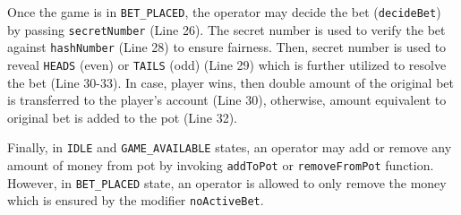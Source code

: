 \documentclass[a4paper,UKenglish,cleveref, autoref, thm-restate]{oasics-v2021}
\begin{document}
%
Once the game is in \texttt{BET\_PLACED}, the operator may decide the bet (\texttt{decideBet}) by passing \texttt{secretNumber} (Line 26). The secret number is used to verify the bet against \texttt{hashNumber} (Line 28) to ensure fairness. 
%
Then, secret number is used to reveal \texttt{HEADS} (even) or \texttt{TAILS} (odd) (Line 29) which is further utilized to resolve the bet (Line 30-33).
%
In case, player wins,  then double amount of the original bet is transferred to the player's account (Line 30), otherwise, amount equivalent to original bet is added to the pot (Line 32). 
%

%
Finally, in \texttt{IDLE} and \texttt{GAME\_AVAILABLE} states, an operator may add or remove any amount of money from pot  by invoking \texttt{addToPot} or \texttt{removeFromPot} function.
However, in \texttt{BET\_PLACED} state, an operator is allowed to only remove the money which is ensured by the modifier \texttt{noActiveBet}.
%
%

%
%
%
%
%
\end{document}
